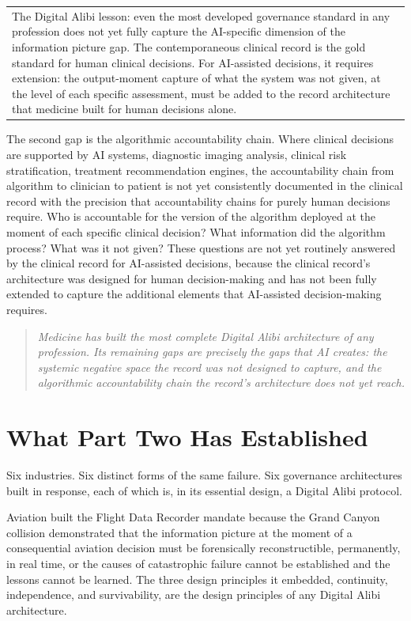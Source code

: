 \begin{longtable}[]{@{}
  >{\raggedright\arraybackslash}p{}@{}}
The Digital Alibi lesson: even the most developed governance standard in any profession does not yet fully capture the AI-specific dimension of the information picture gap. The contemporaneous clinical record is the gold standard for human clinical decisions. For AI-assisted decisions, it requires extension: the output-moment capture of what the system was not given, at the level of each specific assessment, must be added to the record architecture that medicine built for human decisions alone. \\
\end{longtable}

The second gap is the algorithmic accountability chain. Where clinical decisions are supported by AI systems, diagnostic imaging analysis, clinical risk stratification, treatment recommendation engines, the accountability chain from algorithm to clinician to patient is not yet consistently documented in the clinical record with the precision that accountability chains for purely human decisions require. Who is accountable for the version of the algorithm deployed at the moment of each specific clinical decision? What information did the algorithm process? What was it not given? These questions are not yet routinely answered by the clinical record for AI-assisted decisions, because the clinical record's architecture was designed for human decision-making and has not been fully extended to capture the additional elements that AI-assisted decision-making requires.

\begin{quote}
\emph{Medicine has built the most complete Digital Alibi architecture of any profession. Its remaining gaps are precisely the gaps that AI creates: the systemic negative space the record was not designed to capture, and the algorithmic accountability chain the record's architecture does not yet reach.}
\end{quote}

\scenebreak

\section{What Part Two Has Established}

Six industries. Six distinct forms of the same failure. Six governance architectures built in response, each of which is, in its essential design, a Digital Alibi protocol.

Aviation built the Flight Data Recorder mandate because the Grand Canyon collision demonstrated that the information picture at the moment of a consequential aviation decision must be forensically reconstructible, permanently, in real time, or the causes of catastrophic failure cannot be established and the lessons cannot be learned. The three design principles it embedded, continuity, independence, and survivability, are the design principles of any Digital Alibi architecture.

